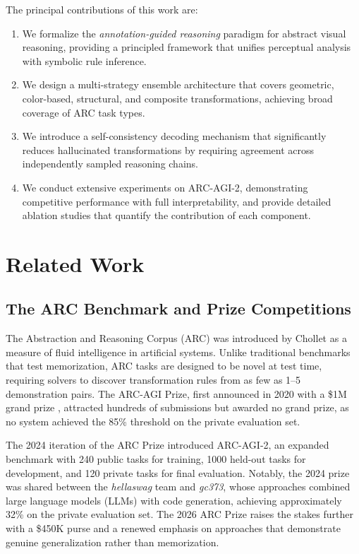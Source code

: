 \documentclass[conference,10pt,letterpaper]{IEEEtran}
\begin{document}
The principal contributions of this work are:

\begin{enumerate}[leftmargin=*,nosep]
    \item We formalize the \emph{annotation-guided reasoning} paradigm for abstract visual reasoning, providing a principled framework that unifies perceptual analysis with symbolic rule inference.
    \item We design a multi-strategy ensemble architecture that covers geometric, color-based, structural, and composite transformations, achieving broad coverage of ARC task types.
    \item We introduce a self-consistency decoding mechanism that significantly reduces hallucinated transformations by requiring agreement across independently sampled reasoning chains.
    \item We conduct extensive experiments on ARC-AGI-2, demonstrating competitive performance with full interpretability, and provide detailed ablation studies that quantify the contribution of each component.
\end{enumerate}

\section{Related Work}
\label{sec:related_work}

\subsection{The ARC Benchmark and Prize Competitions}

The Abstraction and Reasoning Corpus (ARC) was introduced by Chollet \cite{chollet2019measure} as a measure of fluid intelligence in artificial systems. Unlike traditional benchmarks that test memorization, ARC tasks are designed to be novel at test time, requiring solvers to discover transformation rules from as few as 1--5 demonstration pairs. The ARC-AGI Prize, first announced in 2020 with a \$1M grand prize \cite{arcprize2020}, attracted hundreds of submissions but awarded no grand prize, as no system achieved the 85\% threshold on the private evaluation set.

The 2024 iteration of the ARC Prize \cite{arcprize2024} introduced ARC-AGI-2, an expanded benchmark with 240 public tasks for training, 1000 held-out tasks for development, and 120 private tasks for final evaluation. Notably, the 2024 prize was shared between the \emph{hellaswag} team and \emph{gc373}, whose approaches combined large language models (LLMs) with code generation, achieving approximately 32\% on the private evaluation set. The 2026 ARC Prize \cite{arcprize2026} raises the stakes further with a \$450K purse and a renewed emphasis on approaches that demonstrate genuine generalization rather than memorization.
\end{document}
